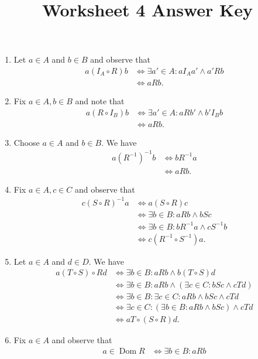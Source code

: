 \documentclass{article}
\title{Worksheet 4 Answer Key}
\author{}\date{}
\DeclareMathOperator{\Dom}{Dom}
\begin{document}
\maketitle

\begin{enumerate}
	\item Let $a\in A$ and $b\in B$ and observe that
		\begin{align*}
			a(I_A\circ R)b
				&\iff	\exists a'\in A : aI_Aa' \wedge a'Rb	\\
				&\iff	aRb.
		\end{align*}
	\item Fix $a\in A,b\in B$ and note that
		\begin{align*}
			a(R\circ I_B)b
				&\iff	\exists a'\in A : aRb' \wedge b'I_Bb	\\
				&\iff	aRb.
		\end{align*}
	\item Choose $a\in A$ and $b\in B$. We have
		\begin{align*}
			a(R^{-1})^{-1}b
				&\iff	bR^{-1}a	\\
				&\iff	aRb.
		\end{align*}
	\item Fix $a\in A, c\in C$ and observe that
		\begin{align*}
			c(S\circ R)^{-1}a
				&\iff	a(S\circ R)c					\\
				&\iff	\exists b\in B : aRb\wedge bSc			\\
				&\iff	\exists b\in B : bR^{-1}a\wedge cS^{-1}b	\\
				&\iff	c(R^{-1}\circ S^{-1})a.
		\end{align*}
	\item Let $a\in A$ and $d\in D$. We have
		\begin{align*}
			a(T\circ S)\circ Rd
				&\iff	\exists b\in B : aRb \wedge b(T\circ S)d			\\
				&\iff	\exists b\in B : aRb \wedge (\exists c\in C : bSc\wedge cTd)	\\
				&\iff	\exists b\in B : \exists c\in C : aRb \wedge bSc\wedge cTd	\\
				&\iff	\exists c\in C : (\exists b\in B :aRb \wedge bSc)\wedge cTd	\\
				&\iff	aT\circ(S\circ R)d.
		\end{align*}
	\item Fix $a\in A$ and observe that
		\begin{align*}
			a\in\Dom R
				&\iff	\exists b\in B : aRb		\\

\end{align*}
\end{enumerate}
\end{document}
